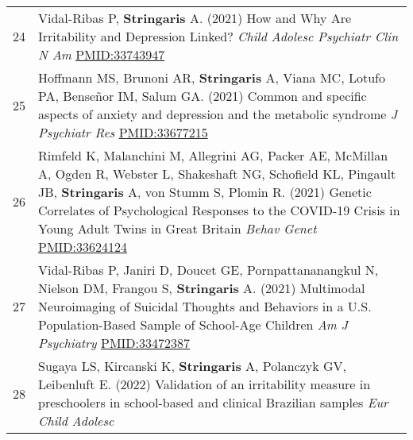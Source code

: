 \documentclass[
]{article}
\begin{document}
\begin{longtable}[]{@{}ll@{}}
\begin{minipage}[t]{0.01\columnwidth}
24\strut
\end{minipage} & \begin{minipage}[t]{0.94\columnwidth}\raggedright
Vidal-Ribas P, \textbf{Stringaris} A. (2021) How and Why Are
Irritability and Depression Linked? \emph{Child Adolesc Psychiatr Clin N
Am} \url{PMID:33743947}\strut
\end{minipage}\tabularnewline
\begin{minipage}[t]{0.01\columnwidth}\raggedright
25\strut
\end{minipage} & \begin{minipage}[t]{0.94\columnwidth}\raggedright
Hoffmann MS, Brunoni AR, \textbf{Stringaris} A, Viana MC, Lotufo PA,
Benseñor IM, Salum GA. (2021) Common and specific aspects of anxiety and
depression and the metabolic syndrome \emph{J Psychiatr Res}
\url{PMID:33677215}\strut
\end{minipage}\tabularnewline
\begin{minipage}[t]{0.01\columnwidth}\raggedright
26\strut
\end{minipage} & \begin{minipage}[t]{0.94\columnwidth}\raggedright
Rimfeld K, Malanchini M, Allegrini AG, Packer AE, McMillan A, Ogden R,
Webster L, Shakeshaft NG, Schofield KL, Pingault JB, \textbf{Stringaris}
A, von Stumm S, Plomin R. (2021) Genetic Correlates of Psychological
Responses to the COVID-19 Crisis in Young Adult Twins in Great Britain
\emph{Behav Genet} \url{PMID:33624124}\strut
\end{minipage}\tabularnewline
\begin{minipage}[t]{0.01\columnwidth}\raggedright
27\strut
\end{minipage} & \begin{minipage}[t]{0.94\columnwidth}\raggedright
Vidal-Ribas P, Janiri D, Doucet GE, Pornpattananangkul N, Nielson DM,
Frangou S, \textbf{Stringaris} A. (2021) Multimodal Neuroimaging of
Suicidal Thoughts and Behaviors in a U.S. Population-Based Sample of
School-Age Children \emph{Am J Psychiatry} \url{PMID:33472387}\strut
\end{minipage}\tabularnewline
\begin{minipage}[t]{0.01\columnwidth}\raggedright
28\strut
\end{minipage} & \begin{minipage}[t]{0.94\columnwidth}\raggedright
Sugaya LS, Kircanski K, \textbf{Stringaris} A, Polanczyk GV, Leibenluft
E. (2022) Validation of an irritability measure in preschoolers in
school-based and clinical Brazilian samples \emph{Eur Child Adolesc
}
\end{minipage}
\end{longtable}
\end{document}
